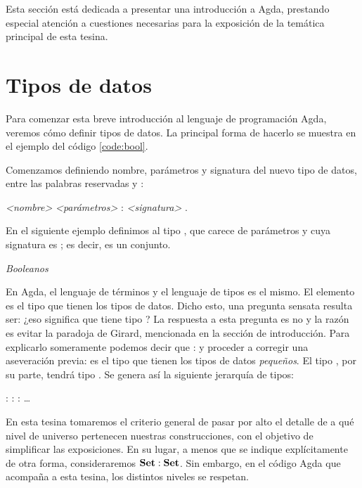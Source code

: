Esta sección está dedicada a presentar una introducción a Agda, prestando especial atención a cuestiones necesarias para la exposición de la temática principal de esta tesina. 
\newpage

\section{Tipos de datos}\label{agda:data}

Para comenzar esta breve introducción al lenguaje de programación Agda, veremos cómo definir tipos de datos. La principal forma de hacerlo se muestra en el ejemplo del código \ref{code:bool}.

Comenzamos definiendo nombre, parámetros y signatura del nuevo tipo de datos, entre las palabras reservadas  y :

 {\it <nombre>} {\it <parámetros>} : {\it <signatura>} .

En el siguiente ejemplo definimos al tipo , que carece de parámetros y cuya signatura es ; es decir, es un conjunto.

\begin{agdacode}{\it Booleanos}\label{code:bool}
  
\end{agdacode}

En Agda, el lenguaje de términos y el lenguaje de tipos es el mismo. El elemento  es el tipo que tienen los tipos de datos. Dicho esto, una pregunta sensata resulta ser: ¿eso significa que  tiene tipo ? La respuesta a esta pregunta es no
y la razón es evitar la paradoja de Girard, mencionada en la sección de introducción.
Para explicarlo someramente podemos decir que  :  y proceder a corregir una aseveración previa:  es el tipo que tienen los tipos de datos {\it pequeños}. El tipo , por su parte, tendrá tipo . Se genera así la siguiente jerarquía de tipos:

\sangrar
{} :  :  :  \ldots

En esta tesina tomaremos el criterio general de pasar por alto el detalle de a qué nivel de universo pertenecen nuestras construcciones, con el objetivo de simplificar las exposiciones. En su lugar, a menos que se indique explícitamente de otra forma, consideraremos $\mathbf{Set} : \mathbf{Set}$. Sin embargo, en el código Agda que acompaña a esta tesina, los distintos niveles se respetan.

